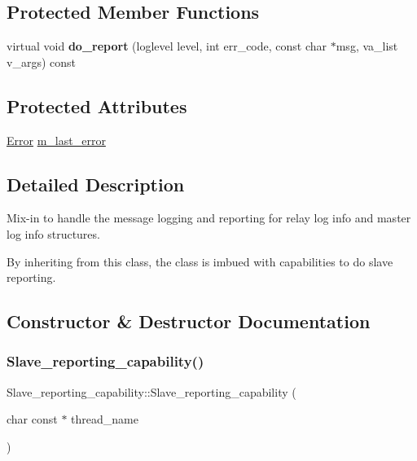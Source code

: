 \subsection*{Protected Member Functions}
\begin{DoxyCompactItemize}
\item 
\mbox{\label{classSlave__reporting__capability_ab67d1296a64f06e10be5e64499dc8025}} 
virtual void {\bfseries do\+\_\+report} (loglevel level, int err\+\_\+code, const char $\ast$msg, va\+\_\+list v\+\_\+args) const
\end{DoxyCompactItemize}
\subsection*{Protected Attributes}
\begin{DoxyCompactItemize}
\item 
\mbox{\hyperlink{classSlave__reporting__capability_1_1Error}{Error}} \mbox{\hyperlink{classSlave__reporting__capability_ae98a14a03e2c638a21a5c1d83a547e86}{m\+\_\+last\+\_\+error}}
\end{DoxyCompactItemize}


\subsection{Detailed Description}
Mix-\/in to handle the message logging and reporting for relay log info and master log info structures.

By inheriting from this class, the class is imbued with capabilities to do slave reporting. 

\subsection{Constructor \& Destructor Documentation}
\mbox{\label{classSlave__reporting__capability_a120871d274a89b1dcb0e8e67490e4987}} 
\subsubsection{\texorpdfstring{Slave\+\_\+reporting\+\_\+capability()}{Slave\_reporting\_capability()}}
{\footnotesize\ttfamily Slave\+\_\+reporting\+\_\+capability\+::\+Slave\+\_\+reporting\+\_\+capability (\begin{DoxyParamCaption}\item[{char const $\ast$}]{thread\+\_\+name }\end{DoxyParamCaption})}

